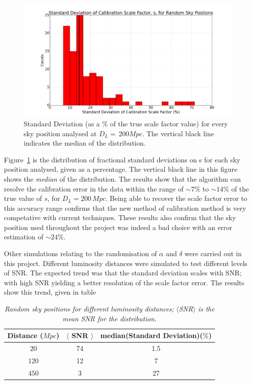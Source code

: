 \documentclass[12pt]{iopart}
\begin{document}
\begin{figure}
  \centering
  \includegraphics[width=\textwidth]{rand_sp_std_D200}
  \caption{Standard Deviation (as a $\%$ of the true scale factor
value) for every sky position analysed at $D_{L}=\,200Mpc$. The vertical black
line indicates the median of the distribution.}
  \label{fig:std-rndsp}
\end{figure}



Figure~\ref{fig:std-rndsp} is the distribution of fractional standard
deviations on s for each sky position analysed, given as a percentage. The
vertical black line in this figure shows the \textit{median} of the
distribution. The results show that the algorithm can resolve the calibration
error in the data within the range of $\sim 7\%$ to $\sim 14\%$ of the true
value of $s$, for $D_{L}=200\,Mpc$. Being able to recover the scale factor
error to this accuracy range confirms that the new method of calibration method
is very competative with current techniques. These results also confirm that
the sky position used throughout the project was indeed a bad choice with an
error estimation of $\sim 24\%$.


Other simulations relating to the randomisation of $\alpha$ and $\delta$ were
carried out in this project. Different luminosity distances were simulated to
test different levels of SNR. The expected trend was that the standard
deviation scales with SNR; with high SNR yielding a better resolution of the
scale factor error. The results show this trend, given in table

\begin{table}
  \centering
  \begin{tabular}{|c|c|c|}
    \hline
    Distance ($Mpc$) &$\langle$ SNR $\rangle$ & median(Standard
Deviation)($\%$) \\
    \hline
    $20$ & 74 & 1.5 \\
    $120$ & 12  & 7 \\
    $450$ & 3 & 27\\
    \hline
  \end{tabular}
  \caption{\textit{Random sky positions for different luminosity distances;
$\langle$SNR$\rangle$ is the mean SNR for the distribution. }}
  \label{tab:dist-randsp}
\end{table}
\end{document}
